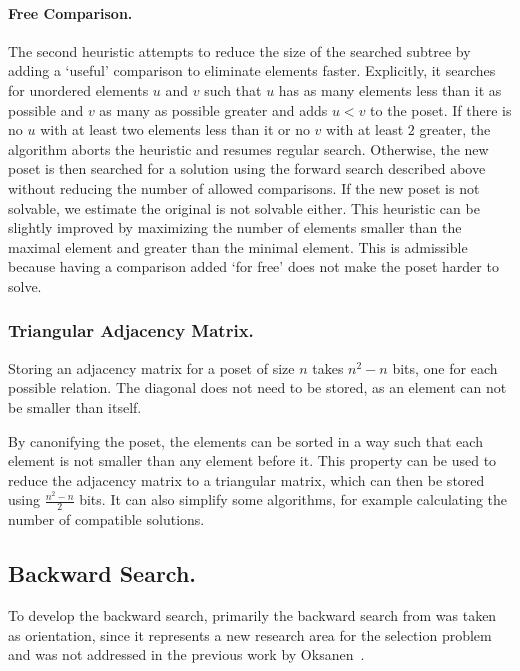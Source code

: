\documentclass[twoside,leqno,twocolumn]{article}
\begin{document}
\paragraph{Free Comparison.}
The second heuristic attempts to reduce the size of the searched subtree by adding a `useful' comparison to eliminate elements faster.
Explicitly, it searches for unordered elements $u$ and $v$ such that $u$ has as many elements less than it as possible and $v$ as many as possible greater and adds $u < v$ to the poset.
If there is no $u$ with at least two elements less than it or no $v$ with at least $2$ greater, the algorithm aborts the heuristic and resumes regular search.
Otherwise, the new poset is then searched for a solution using the forward search described above without reducing the number of allowed comparisons.
If the new poset is not solvable, we estimate the original is not solvable either.
This heuristic can be slightly improved by maximizing the number of elements smaller than the maximal element and greater than the minimal element.
This is admissible because having a comparison added `for free' does not make the poset harder to solve.

\subsubsection{Triangular Adjacency Matrix.}
Storing an adjacency matrix for a poset of size $n$ takes $n^2 - n$ bits, one for each possible relation.
The diagonal does not need to be stored, as an element can not be smaller than itself.

By canonifying the poset, the elements can be sorted in a way such that each element is not smaller than any element before it.
This property can be used to reduce the adjacency matrix to a triangular matrix, which can then be stored using $\frac{n^2 - n}{2}$ bits.
It can also simplify some algorithms, for example calculating the number of compatible solutions.

\subsection{Backward Search.} \label{sec:backward}
To develop the backward search, primarily the backward search from \cite{stober2022lower} was taken as orientation, since it represents a new research area for the selection problem and was not addressed in the previous work by Oksanen~\cite{Oksanen}.
\end{document}
